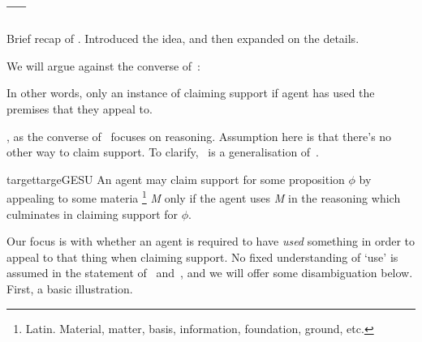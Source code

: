 \subsection{\ESU{-} --- \ESU{}}
\label{sec:esu}

\begin{note}
  Brief recap of \USE{}.
  Introduced the idea, and then expanded on the details.
\end{note}

\begin{note}[Focus]
  We will argue against the converse of~\USE{}:

  \targetESU*

  In other words, only an instance of claiming support if agent has used the premises that they appeal to.

  \ESU{}, as the converse of~\USE{} focuses on reasoning.
  {
    \color{red}
    Assumption here is that there's no other way to claim support.
  }
  To clarify,~\gESU{} is a generalisation of~\ESU{}.


  \begin{restatable}[\gESU{}]{target}{targeGESU}\label{denied-claim}
    An agent may claim support for some proposition \(\phi\) by appealing to some materia\nolinebreak
    \footnote{Latin.
      Material, matter, basis, information, foundation, ground, etc.
    }
    \emph{M} only if the agent uses \emph{M} in the reasoning which culminates in claiming support for \(\phi\).
  \end{restatable}
  Our focus is with whether an agent is required to have \emph{used} something in order to appeal to that thing when claiming support.
  No fixed understanding of `use' is assumed in the statement of~\ESU{} and~\gESU{}, and we will offer some disambiguation below.
  First, a basic illustration.
\end{note}

